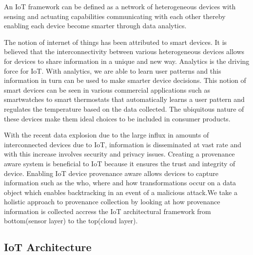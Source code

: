 \begin{definition}
An IoT framework can be defined as a network of heterogeneous devices with sensing and actuating capabilities communicating with each other thereby enabling each device become smarter through data analytics. 

\end{definition}

The notion of internet of things has been attributed to smart devices. It is believed that the interconnectivity between various heterogeneous devices allows for devices to share information in a unique and new way. Analytics is the driving force for IoT. With analytics, we are able to learn user patterns  and this information in turn can be used to make smarter device decisions. This notion of smart devices can be seen in various commercial applications such as smartwatches to smart thermostats that automatically learns a user pattern and regulates the temperature based on the data collected. The ubiquitous nature of these devices make them ideal choices to be included in consumer products. 

\par With the recent data explosion due to the large influx in amounts of interconnected devices due to IoT, information is disseminated at vast rate and with this increase involves security and privacy issues. Creating a provenance aware system is beneficial to IoT because it ensures the trust and  integrity of device. Enabling IoT device provenance aware allows devices to capture information such as the who, where and how transformations occur on a data object which enables  backtracking in an event of a malicious attack.We take a holistic approach to provenance collection by looking at how provenance information is collected accress the IoT architectural framework from bottom(sensor layer) to the top(cloud layer).

 
  \subsection{IoT Architecture}

